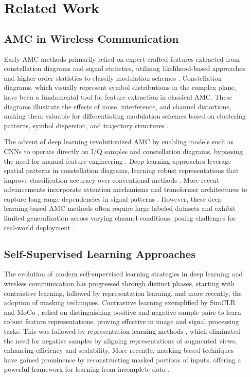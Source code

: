 \section{Related Work}

\subsection{AMC in Wireless Communication}

Early AMC methods primarily relied on expert-crafted features extracted from constellation diagrams and signal statistics, utilizing likelihood-based approaches and higher-order statistics to classify modulation schemes \cite{dobre2007survey}. Constellation diagrams, which visually represent symbol distributions in the complex plane, have been a fundamental tool for feature extraction in classical AMC. These diagrams illustrate the effects of noise, interference, and channel distortions, making them valuable for differentiating modulation schemes based on clustering patterns, symbol dispersion, and trajectory structures \cite{o2018over}. 

The advent of deep learning revolutionized AMC by enabling models such as CNNs to operate directly on I/Q samples and constellation diagrams, bypassing the need for manual feature engineering \cite{zhang2021efficient}. Deep learning approaches leverage spatial patterns in constellation diagrams, learning robust representations that improve classification accuracy over conventional methods \cite{doan2020learning}. More recent advancements incorporate attention mechanisms and transformer architectures to capture long-range dependencies in signal patterns \cite{hamidi2021mcformer}. However, these deep learning-based AMC methods often require large labeled datasets and exhibit limited generalization across varying channel conditions, posing challenges for real-world deployment \cite{ya2022large}.

\subsection{Self-Supervised Learning Approaches}

The evolution of modern self-supervised learning strategies in deep learning and wireless communication has progressed through distinct phases, starting with contrastive learning, followed by representation learning, and more recently, the adoption of masking techniques.  Contrastive learning exemplified by SimCLR~\cite{chen2020simple} and MoCo \cite{he2020momentumcontrastunsupervisedvisual}, relied on distinguishing positive and negative sample pairs to learn robust feature representations, proving effective in image and signal processing tasks. This was followed by representation learning methods \cite{grill2020bootstraplatentnewapproach, berthelot2019mixmatch}, which eliminated the need for negative samples by aligning representations of augmented views, enhancing efficiency and scalability. More recently, masking-based techniques \cite{devlin2019bertpretrainingdeepbidirectional, he2021maskedautoencodersscalablevision} have gained prominence by reconstructing masked portions of inputs, offering a powerful framework for learning from incomplete data \cite{faysal2025denomae}.

